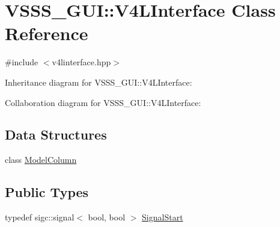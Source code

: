 \hypertarget{class_v_s_s_s___g_u_i_1_1_v4_l_interface}{}\section{V\+S\+S\+S\+\_\+\+G\+UI\+:\+:V4\+L\+Interface Class Reference}
\label{class_v_s_s_s___g_u_i_1_1_v4_l_interface}


{\ttfamily \#include $<$v4linterface.\+hpp$>$}



Inheritance diagram for V\+S\+S\+S\+\_\+\+G\+UI\+:\+:V4\+L\+Interface\+:


Collaboration diagram for V\+S\+S\+S\+\_\+\+G\+UI\+:\+:V4\+L\+Interface\+:
\subsection*{Data Structures}
\begin{DoxyCompactItemize}
\item 
class \hyperlink{class_v_s_s_s___g_u_i_1_1_v4_l_interface_1_1_model_column}{Model\+Column}
\end{DoxyCompactItemize}
\subsection*{Public Types}
\begin{DoxyCompactItemize}
\item 
typedef sigc\+::signal$<$ bool, bool $>$ \hyperlink{class_v_s_s_s___g_u_i_1_1_v4_l_interface_aaa97121c9564dbb8c0717725a795ed15}{Signal\+Start}
\end{DoxyCompactItemize}
